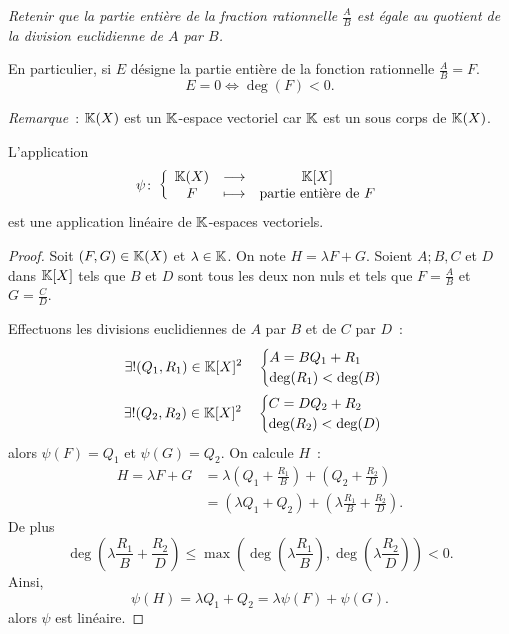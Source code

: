 \emph{Retenir que la partie entière de la fraction rationnelle \(\frac{A}{B}\) est égale au quotient de la division euclidienne de \(A\) par \(B\).}

En particulier, si \(E\) désigne la partie entière de la fonction rationnelle \(\frac{A}{B}=F\).
\begin{equation}
  E=0 \iff \deg(F) <0.
\end{equation}

\emph{Remarque}~: \(\mathbb{K}(X)\) est un \(\mathbb{K}\)-espace vectoriel car \(\mathbb{K}\) est un sous corps de \(\mathbb{K}(X)\).

\begin{prop}
  L'application
  \begin{equation}
    \psi\colon \left\{\begin{array}{ccc} \mathbb{K}(X) & \longrightarrow &\mathbb{K}[X]\\ F & \longmapsto & \text{partie entière de } F \end{array} \right.
  \end{equation}
  est une application linéaire de \(\mathbb{K}\)-espaces vectoriels.
\end{prop}
\begin{proof}
  Soit \((F,G) \in \mathbb{K}(X)\) et \(\lambda \in \mathbb{K}\). On note \(H=\lambda F+G\). Soient \(A;B,C\) et \(D\) dans \(\mathbb{K}[X]\) tels que \(B\) et \(D\) sont tous les deux non nuls et tels que \(F=\frac{A}{B}\) et \(G=\frac{C}{D}\).

  Effectuons les divisions euclidiennes de \(A\) par \(B\) et de \(C\) par \(D\)~:
  \begin{align}
    \exists! (Q_1,R_1) \in \mathbb{K}[X]^2 \quad \begin{cases} A = BQ_1+R_1 \\ \deg(R_1) < \deg(B) \end{cases} \\ 
    \exists! (Q_2,R_2) \in \mathbb{K}[X]^2 \quad \begin{cases} C = DQ_2+R_2 \\ \deg(R_2) < \deg(D) \end{cases}
  \end{align}
  alors \(\psi(F)=Q_1\) et \(\psi(G)=Q_2\). On calcule \(H\)~:
  \begin{align}
    H = \lambda F+G &= \lambda\left(Q_1+\frac{R_1}{B}\right)+\left(Q_2+\frac{R_2}{D}\right) \\
                    &=(\lambda Q_1 +Q_2) +\left(\lambda \frac{R_1}{B} +\frac{R_2}{D} \right).
  \end{align}
  De plus
  \begin{equation}
    \deg\left(\lambda \frac{R_1}{B} +\frac{R_2}{D} \right) \leqslant \max\left(\deg\left(\lambda \frac{R_1}{B}\right),\deg\left(\lambda \frac{R_2}{D}\right)\right) <0.
  \end{equation}
  Ainsi,
  \begin{equation}
    \psi(H)= \lambda Q_1+Q_2 = \lambda \psi(F)+\psi(G).
  \end{equation}
  alors \(\psi\) est linéaire.
\end{proof}

